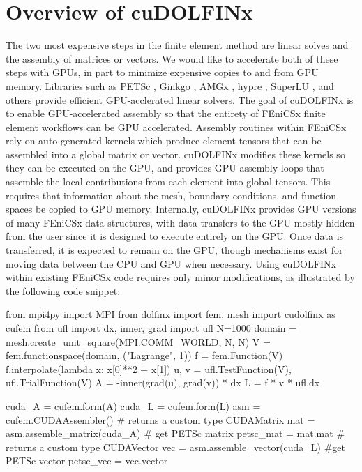 \section*{Overview of cuDOLFINx}

The two most expensive steps in the finite element method are linear solves and the assembly of matrices or vectors. We would like to accelerate both of these steps with GPUs, in part to minimize expensive copies to and from GPU memory. Libraries such as PETSc \citep{MILLS2021102831},  Ginkgo \citep{ginkgo-toms-2022}, AMGx \citep{naumov2015amgx}, hypre \citep{li2020efficient, falgout2021porting}, SuperLU \citep{li2023newly}, and others \citep{lu2023tilesptrsv} provide efficient GPU-acclerated linear solvers. The goal of cuDOLFINx is to enable GPU-accelerated assembly so that the entirety of FEniCSx finite element workflows can be GPU accelerated. Assembly routines within FEniCSx rely on auto-generated kernels which produce element tensors that can be assembled into a global matrix or vector. cuDOLFINx modifies these kernels so they can be executed on the GPU, and provides GPU assembly loops that assemble the local contributions from each element into global tensors. This requires that information about the mesh, boundary conditions, and function spaces be copied to GPU memory. Internally, cuDOLFINx provides GPU versions of many FEniCSx data structures, with data transfers to the GPU mostly hidden from the user since it is designed to execute entirely on the GPU. Once data is transferred, it is expected to remain on the GPU, though mechanisms exist for moving data between the CPU and GPU when necessary. Using cuDOLFINx within existing FEniCSx code requires only minor modifications, as illustrated by the following code snippet:

\begin{python}
from mpi4py import MPI
from dolfinx import fem, mesh
import cudolfinx as cufem
from ufl import dx, inner, grad
import ufl
N=1000
domain = mesh.create_unit_square(MPI.COMM_WORLD, N, N)
V = fem.functionspace(domain, ("Lagrange", 1))
f = fem.Function(V)
f.interpolate(lambda x: x[0]**2 + x[1])
u, v = ufl.TestFunction(V), ufl.TrialFunction(V) 
A = -inner(grad(u), grad(v)) * dx
L = f * v * ufl.dx 

cuda_A = cufem.form(A)
cuda_L = cufem.form(L)
asm = cufem.CUDAAssembler()
# returns a custom type CUDAMatrix
mat = asm.assemble_matrix(cuda_A)
# get PETSc matrix
petsc_mat = mat.mat
# returns a custom type CUDAVector
vec = asm.assemble_vector(cuda_L)
#get PETSc vector
petsc_vec = vec.vector
\end{python}

